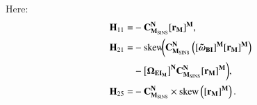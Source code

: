 \documentclass[3p]{elsarticle}
\begin{document}
Here:
\begin{align}
{{\mathbf{H}}_{{11}}} =& - { {{\mathbf{ C}}_{\mathbf{M}_{\text{SINS}}}^{\mathbf{N}}{{{\left[{{\mathbf{r}}_{\mathbf{M}}}\right]}^{\mathbf{M}}}}} },\\
 {{\mathbf{H}}_{{{21}}}} =&  - \textrm{skew}\!\biggl({ \mathbf{C}}_{\mathbf{M}_{\text{SINS}}}^{\mathbf{N}}\left( {{\left[{\boldsymbol{\tilde \omega }}_{{\mathbf{BI}}}\right]}^{\mathbf{M}}{{\left[{{\mathbf{r}}_{\mathbf{M}}}\right]}^{\mathbf{M}}}} \right)  \\
 	& - {\left[{\boldsymbol{\Omega }}_{{\mathbf{EI}}_{\mathbf{M}}}\right]}^{\mathbf{N}}{\mathbf{ C}}_{\mathbf{M}_{\text{SINS}}}^{\mathbf{N}} {{{\left[{{\mathbf{r}}_{\mathbf{M}}}\right]}^{\mathbf{M}}}  } \biggl) \notag , \\
 {{\mathbf{H}}_{{{25}}}} =&  - {\mathbf{ C}}_{\mathbf{M}_{\text{SINS}}}^{\mathbf{N}} \times \textrm{skew}\left(
	{{{\left[{{\mathbf{r}}_{\mathbf{M}}}\right]}^{\mathbf{M}}}  }
\right).
\end{align}
\end{document}
